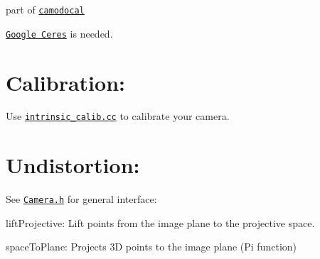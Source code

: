 part of \href{https://github.com/hengli/camodocal}{\tt camodocal}

\href{http://ceres-solver.org}{\tt Google Ceres} is needed.

\section*{Calibration\+:}

Use \href{https://github.com/dvorak0/camera_model/blob/master/src/intrinsic_calib.cc}{\tt intrinsic\+\_\+calib.\+cc} to calibrate your camera.

\section*{Undistortion\+:}

See \href{https://github.com/dvorak0/camera_model/blob/master/include/camodocal/camera_models/Camera.h}{\tt Camera.\+h} for general interface\+:


\begin{DoxyItemize}
\item lift\+Projective\+: Lift points from the image plane to the projective space.
\item space\+To\+Plane\+: Projects 3D points to the image plane (Pi function) 
\end{DoxyItemize}